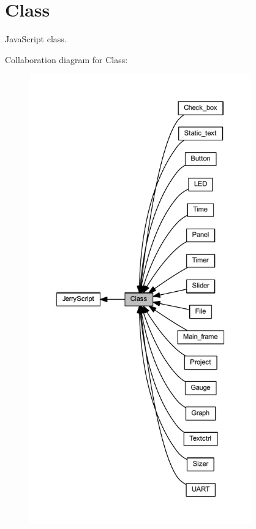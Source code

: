 \section{Class}
\label{group___class}


Java\+Script class.  


Collaboration diagram for Class\+:
\nopagebreak
\begin{figure}[H]
\begin{center}
\leavevmode
\includegraphics[height=550pt]{group___class}
\end{center}
\end{figure}
